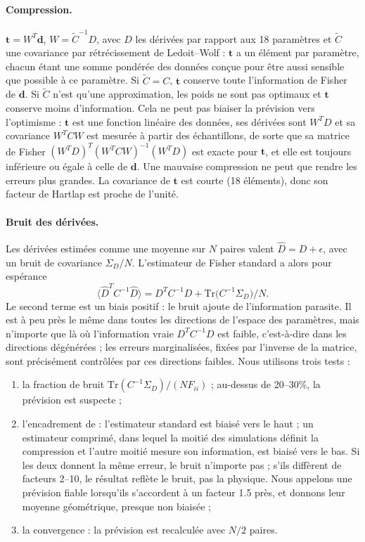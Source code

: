 \paragraph{Compression.} $\boldsymbol t = W^T\boldsymbol d$, $W=\tilde C^{-1}D$, avec $D$ les dérivées par rapport aux 18 paramètres et $\tilde C$ une covariance par rétrécissement de Ledoit--Wolf : $\boldsymbol t$ a un élément par paramètre, chacun étant une somme pondérée des données conçue pour être aussi sensible que possible à ce paramètre. Si $\tilde C=C$, $\boldsymbol t$ conserve toute l'information de Fisher de $\boldsymbol d$. Si $\tilde C$ n'est qu'une approximation, les poids ne sont pas optimaux et $\boldsymbol t$ conserve moins d'information. Cela ne peut pas biaiser la prévision vers l'optimisme : $\boldsymbol t$ est une fonction linéaire des données, ses dérivées sont $W^TD$ et sa covariance $W^TCW$ est mesurée à partir des échantillons, de sorte que sa matrice de Fisher $(W^TD)^T(W^TCW)^{-1}(W^TD)$ est exacte pour $\boldsymbol t$, et elle est toujours inférieure ou égale à celle de $\boldsymbol d$. Une mauvaise compression ne peut que rendre les erreurs plus grandes. La covariance de $\boldsymbol t$ est courte (18 éléments), donc son facteur de Hartlap est proche de l'unité.

\paragraph{Bruit des dérivées.} Les dérivées estimées comme une moyenne sur $N$ paires valent $\hat D = D + \epsilon$, avec un bruit de covariance $\Sigma_D/N$. L'estimateur de Fisher standard a alors pour espérance
\begin{equation}
\langle \hat D^T C^{-1}\hat D\rangle = D^T C^{-1} D + \mathrm{Tr}\big(C^{-1}\Sigma_D\big)/N .
\end{equation}
Le second terme est un biais positif : le bruit ajoute de l'information parasite. Il est à peu près le même dans toutes les directions de l'espace des paramètres, mais n'importe que là où l'information vraie $D^TC^{-1}D$ est faible, c'est-à-dire dans les directions dégénérées ; les erreurs marginalisées, fixées par l'inverse de la matrice, sont précisément contrôlées par ces directions faibles. Nous utilisons trois tests :
\begin{enumerate}
\item la fraction de bruit $\mathrm{Tr}(C^{-1}\Sigma_D)/(N F_{ii})$ ; au-dessus de 20--30\%, la prévision est suspecte ;
\item l'encadrement de \cite{CoultonWandelt2023} : l'estimateur standard est biaisé vers le haut ; un estimateur comprimé, dans lequel la moitié des simulations définit la compression et l'autre moitié mesure son information, est biaisé vers le bas. Si les deux donnent la même erreur, le bruit n'importe pas ; s'ils diffèrent de facteurs 2--10, le résultat reflète le bruit, pas la physique. Nous appelons une prévision fiable lorsqu'ils s'accordent à un facteur 1.5 près, et donnons leur moyenne géométrique, presque non biaisée ;
\item la convergence : la prévision est recalculée avec $N/2$ paires.
\end{enumerate}

